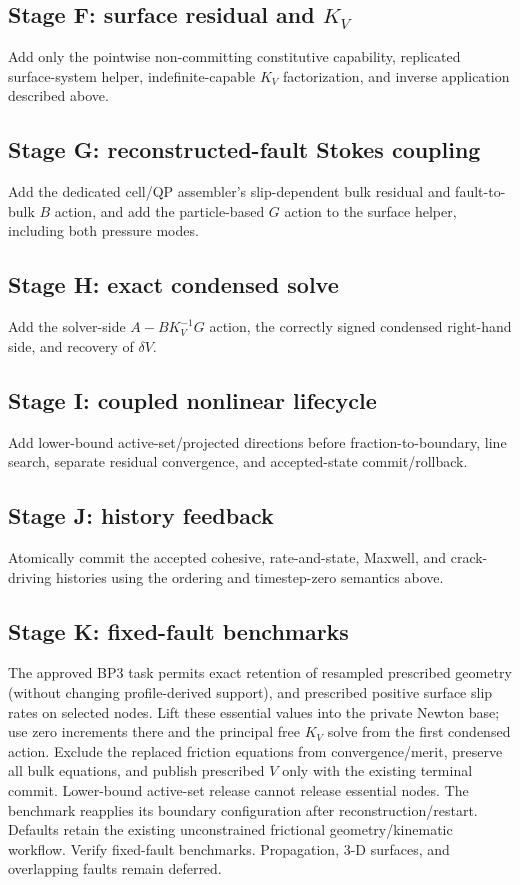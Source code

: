 \documentclass[11pt]{article}
\begin{document}
\subsection*{Stage F: surface residual and \(K_V\)}
Add only the pointwise non-committing constitutive capability, replicated
surface-system helper, indefinite-capable \(K_V\) factorization, and inverse
application described above.

\subsection*{Stage G: reconstructed-fault Stokes coupling}
Add the dedicated cell/QP assembler's slip-dependent bulk residual and
fault-to-bulk $B$ action, and add the particle-based $G$ action to the surface
helper, including both pressure modes.

\subsection*{Stage H: exact condensed solve}
Add the solver-side \(A-BK_V^{-1}G\) action, the correctly signed condensed
right-hand side, and recovery of \(\delta V\).

\subsection*{Stage I: coupled nonlinear lifecycle}
Add lower-bound active-set/projected directions before fraction-to-boundary,
line search, separate residual convergence, and accepted-state
commit/rollback.

\subsection*{Stage J: history feedback}
Atomically commit the accepted cohesive, rate-and-state, Maxwell, and
crack-driving histories using the ordering and timestep-zero semantics above.

\subsection*{Stage K: fixed-fault benchmarks}
The approved BP3 task permits exact retention of resampled prescribed geometry
(without changing profile-derived support), and prescribed positive surface
slip rates on selected nodes. Lift these essential values into the private
Newton base; use zero increments there and the principal free $K_V$ solve
from the first condensed action. Exclude the replaced friction equations from
convergence/merit, preserve all bulk equations, and publish prescribed $V$
only with the existing terminal commit. Lower-bound active-set release cannot
release essential nodes. The benchmark reapplies its boundary configuration
after reconstruction/restart. Defaults retain the existing unconstrained
frictional geometry/kinematic workflow.
Verify fixed-fault benchmarks. Propagation, 3-D surfaces, and overlapping
faults remain deferred.
\end{document}
